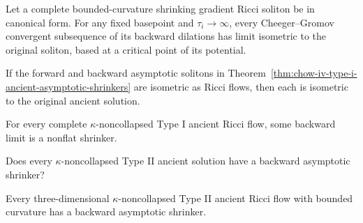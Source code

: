 \begin{proposition}
\label{prop:chow-iv-shrinker-backward-limit-isometric}
Let a complete bounded-curvature shrinking gradient Ricci soliton be in
canonical form.  For any fixed basepoint and \(\tau_i\to\infty\), every
Cheeger--Gromov convergent subsequence of its backward dilations has limit
isometric to the original soliton, based at a critical point of its potential.
\end{proposition}

\begin{theorem}
\label{thm:chow-iv-equal-asymptotic-shrinkers-rigidity}
If the forward and backward asymptotic solitons in
Theorem~\ref{thm:chow-iv-type-i-ancient-asymptotic-shrinkers} are isometric
as Ricci flows, then each is isometric to the original ancient solution.
\end{theorem}

\begin{theorem}
\label{thm:chow-iv-type-i-ancient-nonflat-backward-shrinker}
For every complete \(\kappa\)-noncollapsed Type I ancient Ricci flow, some
backward limit is a nonflat shrinker.
\end{theorem}

\begin{conjecture}
\label{conj:chow-iv-type-ii-ancient-backward-shrinker}
Does every \(\kappa\)-noncollapsed Type II ancient solution have a backward
asymptotic shrinker?
\end{conjecture}

\begin{theorem}
\label{thm:chow-iv-three-dimensional-type-ii-asymptotic-shrinker}
Every three-dimensional \(\kappa\)-noncollapsed Type II ancient Ricci flow
with bounded curvature has a backward asymptotic shrinker.
\end{theorem}

